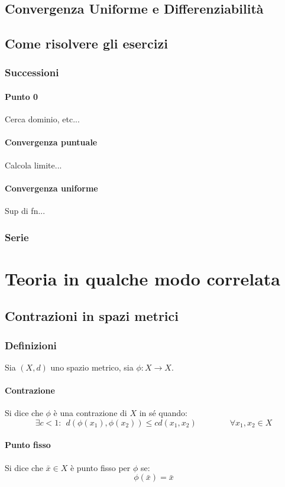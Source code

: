 \documentclass[a4paper,12pt]{article}
\begin{document}
\subsection{Convergenza Uniforme e Differenziabilità}

\subsection{Come risolvere gli esercizi}
\subsubsection{Successioni}
\paragraph{Punto 0}
Cerca dominio, etc...
\paragraph{Convergenza puntuale}
Calcola limite...
\paragraph{Convergenza uniforme}
Sup di fn...

\subsubsection{Serie}

\section{Teoria in qualche modo correlata}

\subsection{Contrazioni in spazi metrici}
\subsubsection{Definizioni}
Sia $(X, d)$ uno spazio metrico, sia $\phi : X\rightarrow X$.
\paragraph{Contrazione}
Si dice che $\phi$ è una contrazione di $X$ in sé quando:
$$\exists c < 1:\ \ d(\phi(x_1), \phi(x_2)) \leq cd(x_1, x_2)\qquad\qquad\forall x_1, x_2 \in X$$
\paragraph{Punto fisso}
Si dice che $\bar{x}\in X$ è punto fisso per $\phi$ se:
$$\phi(\bar{x})=\bar{x}$$
\end{document}
